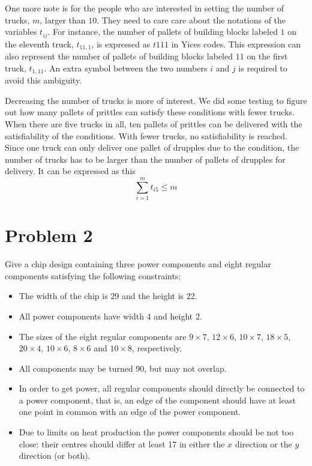 \documentclass[11pt]{article}
\begin{document}
One more note is for the people who are interested in setting the number of trucks, $m$, larger than $10$. They need to care care about the notations of the variables $t_{ij}$. For instance, the number of pallets of building blocks labeled $1$ on the eleventh truck, $t_{11,1}$, is expressed as  $t111$ in Yices codes. This expression can also represent the number of pallets of building blocks labeled $11$ on the first truck, $t_{1,11}$. An extra symbol between the two numbers $i$ and $j$ is required to avoid this ambiguity.

Decreasing the number of trucks is more of interest. We did some testing to figure out how many pallets of prittles can satisfy these conditions with fewer trucks. When there are five trucks in all, ten pallets of prittles can be delivered with the satisfiability of the conditions. With fewer trucks, no satisfiability is reached. Since one truck can only deliver one pallet of drupples due to the condition, the number of trucks has to be larger than the number of pallets of drupples for delivery. It can be expressed as this
\[ \sum_{i=1}^m t_{i5}\leq m \]


\section*{Problem 2}

Give a chip design containing three power components and eight regular components satisfying the following constraints:
\begin{itemize}
  \item The width of the chip is 29 and the height is 22.
  \item All power components have width 4 and height 2.
  \item The sizes of the eight regular components are $9 \times 7$, $12 \times 6$, $10 \times 7$, $18 \times 5$, $20 \times 4$, $10 \times 6$, $8 \times 6$ and $10 \times 8$, respectively.
  \item All components may be turned 90, but may not overlap.
  \item In order to get power, all regular components should directly be connected to a power component, that is, an edge of the component should have at least one point in common with an edge of the power component.
  \item Due to limits on heat production the power components should be not too close: their centres should differ at least 17 in either the $x$ direction or the $y$ direction (or both).
\end{itemize}
\end{document}
